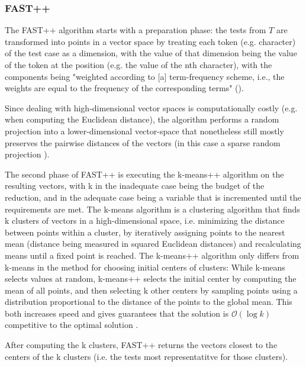 \subsubsection{FAST++}


The FAST++ algorithm starts with a preparation phase: the tests from $T$
are transformed into points in a vector space by treating each token
(e.g. character) of the test case as a dimension, with the value of that
dimension being the value of the token at the position (e.g. the value
of the nth character), with the components being "weighted according to
[a] term-frequency scheme, i.e., the weights are equal to the frequency
of the corresponding terms" (\cite{cruciani2019scalable}).

Since dealing with high-dimensional vector spaces is computationally
costly (e.g. when computing the Euclidean distance), the algorithm
performs a random projection into a lower-dimensional vector-space that
nonetheless still mostly preserves the pairwise distances of the vectors
(in this case a sparse random projection \cite{achlioptas2003database}).

The second phase of FAST++ is executing the k-means++ algorithm
\cite{arthur2006k} on the resulting vectors, with k in the inadequate
case being the budget of the reduction, and in the adequate case being a
variable that is incremented until the requirements are met. The k-means
algorithm is a clustering algorithm that finds k clusters of vectors in a
high-dimensional space, i.e. minimizing the distance between points within
a cluster, by iteratively assigning points to the nearest mean (distance
being measured in squared Euclidean distances) and recalculating means
until a fixed point is reached. The k-means++ algorithm only differs
from k-means in the method for choosing initial centers of clusters:
While k-means selects values at random, k-means++ selects the initial
center by computing the mean of all points, and then selecting k other
centers by sampling points using a distribution proportional to the
distance of the points to the global mean. This both increases speed and
gives guarantees that the solution is $\mathcal{O}(\log k)$ competitive
to the optimal solution \cite{arthur2006k}.

After computing the k clusters, FAST++ returns the vectors closest to
the centers of the k clusters (i.e. the tests most representatitve for
those clusters).

